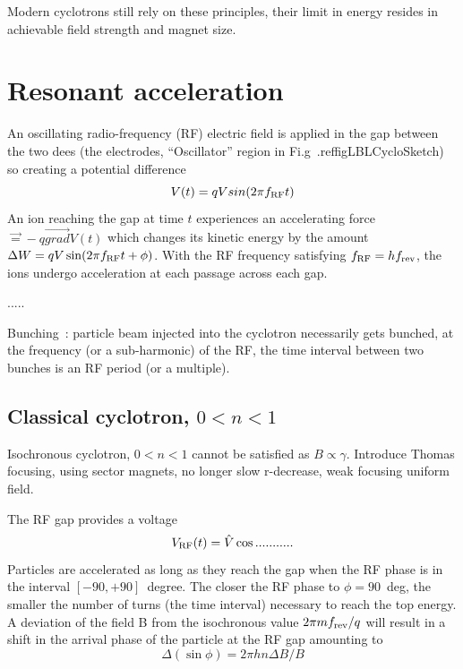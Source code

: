   Modern cyclotrons still  rely on these principles,
their limit in energy resides in achievable field strength and magnet size. 



\section{Resonant acceleration \label{secCycloClassAccel}}

An oscillating radio-frequency (RF) electric field 
is applied in the gap between the two dees (the electrodes, 
 ``Oscillator'' region in Fi.g~.ref{figLBLCycloSketch})
so creating a potential difference 
\begin{equation}
\label{EqRFCyclo}
 V(t) = qV sin(2\pi f_{\rm RF}t)
\end{equation}
An  ion reaching the gap at time $t$  experiences an accelerating force $\vec = -q \vec{grad}V(t)$ which changes 
its  kinetic energy by the amount $\Delta W = q V \sin(2\pi f_{\rm RF}t + \phi)$. 
With the  RF frequency satisfying $f_{\rm RF} = h f_{\rm rev}$,   the ions undergo acceleration at each passage across each gap. 


.....

     Bunching~: particle beam injected into the cyclotron necessarily gets bunched, at the 
frequency (or a sub-harmonic) of the RF, 
the time interval between two bunches is an RF period (or a multiple).




\subsection{Classical cyclotron, $0<n<1$}


Isochronous cyclotron, $0<n<1$ cannot be satisfied as $B\propto \gamma$. Introduce Thomas focusing, using sector magnets,
no longer slow r-decrease, weak focusing uniform field.



The RF gap provides a voltage  
\begin{equation}
\label{EqRFVolt}
V_{\rm RF}(t) =\hat V \cos ........... 
\end{equation}
Particles are accelerated as long as they reach the gap when the RF phase is in the 
interval $[-90,+90]$~degree. 
The closer the RF phase to $\phi=90$~deg, the smaller the number of turns 
(the time interval) necessary to reach the top energy. 
A deviation of the field B from the isochronous value $2\pi m f_{\rm rev}/q$
will result in a  shift in the arrival phase of the particle at the RF gap amounting to 
\begin{equation}
\label{EqPFPhaseCyclo}
\Delta (\sin \phi) = 2\pi h n \Delta B/B
\end{equation}


